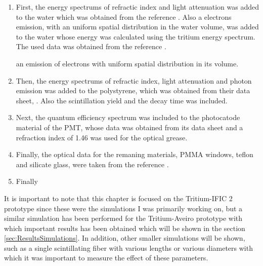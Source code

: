 \begin{enumerate}

\item{} First, the energy spectrums of refractic index and light attenuation was added to the water which was obtained from the reference \cite{WaterPropertiesSimulation}. Also a electrons emission, with an uniform spatial distribution in the water volume, was added to the water whose energy was calculated using the tritium energy spectrum. The used data was obtained from the reference \cite{TritiumEmissionSpectrum}.

an emission of electrons with uniform spatial distribution in its volume.

\item{} Then, the energy spectrums of refractic index, light attenuation and photon emission was added to the polystyrene, which was obtained from their data sheet, \cite{DataSheetBCF12Fiber}.  Also the scintillation yield and the decay time was included. 

\item{} Next, the quantum efficiency spectrum was included to the photocatode material of the PMT, whose data was obtained from its data sheet \cite{DataSheetPMTs} and a refraction index of 1.46 was used for the optical grease.

\item{} Finally, the optical data for the remaning materials, PMMA windows, teflon and silicate glass, were taken from the reference \cite{NEMODataSimulation}.

\item{} Finally 
\end{enumerate} 

It is important to note that this chapter is focused on the Tritium-IFIC 2 prototype since these were the simulations I was primarily working on, but a similar simulation has been performed for the Tritium-Aveiro prototype with which important results has been obtained which will be shown in the section \ref{sec:ResultsSimulations}. In addition, other smaller simulations will be shown, such as a single scintillating fiber with various lengths or various diameters with which it was important to measure the effect of these parameters.